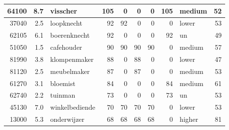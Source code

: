\begin{table}
\begin{tabular}[t]{r|r|l|r|r|r|r|r|l|r}
\hline
64100 & 8.7 & visscher & 105 & 0 & 0 & 0 & 105 & medium & 52\\
\hline
37040 & 2.5 & loopknecht & 92 & 92 & 0 & 0 & 0 & lower & 53\\
\hline
62105 & 6.1 & boerenknecht & 92 & 0 & 0 & 0 & 92 & un & 49\\
\hline
51050 & 1.5 & cafehouder & 90 & 90 & 90 & 90 & 0 & medium & 57\\
\hline
81990 & 3.8 & klompenmaker & 88 & 0 & 88 & 0 & 0 & lower & 47\\
\hline
81120 & 2.5 & meubelmaker & 87 & 0 & 87 & 0 & 0 & medium & 53\\
\hline
61270 & 3.1 & bloemist & 84 & 0 & 0 & 0 & 84 & medium & 61\\
\hline
62740 & 2.2 & tuinman & 73 & 0 & 0 & 0 & 73 & un & 53\\
\hline
45130 & 7.0 & winkelbediende & 70 & 70 & 70 & 70 & 0 & lower & 53\\
\hline
13000 & 5.3 & onderwijzer & 68 & 68 & 68 & 68 & 0 & higher & 81\\
\hline
\end{tabular}
\end{table}
